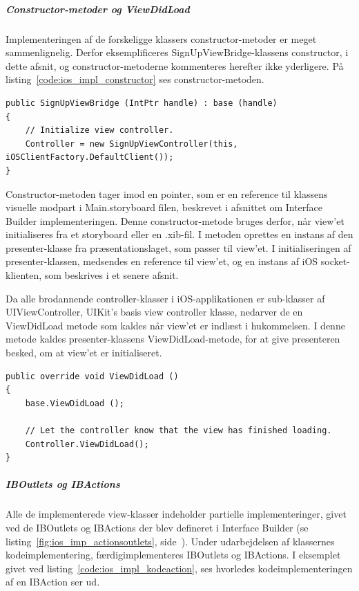 \subparagraph{Constructor-metoder og ViewDidLoad}
Implementeringen af de forskeligge klassers constructor-metoder er meget sammenlignelig. Derfor eksemplificeres SignUpViewBridge-klassens constructor, i dette afsnit, og constructor-metoderne kommenteres herefter ikke yderligere. På listing~\ref{code:ios_impl_constructor} ses constructor-metoden.

\begin{lstlisting}[caption={SignUpViewBridge(...)},label={code:ios_impl_constructor}]
public SignUpViewBridge (IntPtr handle) : base (handle)
{
	// Initialize view controller.
	Controller = new SignUpViewController(this, iOSClientFactory.DefaultClient());
}
\end{lstlisting}

Constructor-metoden tager imod en pointer, som er en reference til klassens visuelle modpart i Main.storyboard filen, beskrevet i afsnittet om Interface Builder implementeringen. Denne constructor-metode bruges derfor, når view'et initialiseres fra et storyboard eller en .xib-fil. I metoden oprettes en instans af den presenter-klasse fra præsentationslaget, som passer til view'et. I initialiseringen af presenter-klassen, medsendes en reference til view'et, og en instans af iOS socket-klienten, som beskrives i et senere afsnit.

Da alle brodannende controller-klasser i iOS-applikationen er sub-klasser af UIViewController, UIKit's basis view controller klasse, nedarver de en ViewDidLoad metode som kaldes når view'et er indlæst i hukommelsen. I denne metode kaldes presenter-klassens ViewDidLoad-metode, for at give presenteren besked, om at view'et er initialiseret.

\begin{lstlisting}[caption={ViewDidLoad() i SignUpViewBridge},label={code:ios_impl_viewdidload}]
public override void ViewDidLoad ()
{
	base.ViewDidLoad ();
	
	// Let the controller know that the view has finished loading.
	Controller.ViewDidLoad();
}
\end{lstlisting}

\subparagraph{IBOutlets og IBActions}
Alle de implementerede view-klasser indeholder partielle implementeringer, givet ved de IBOutlets og IBActions der blev defineret i Interface Builder (se listing~\ref{fig:ios_imp_actionsoutlets}, side~\pageref{fig:ios_imp_actionsoutlets}). Under udarbejdelsen af klassernes kodeimplementering, færdigimplementeres IBOutlets og IBActions. I eksemplet givet ved listing~\ref{code:ios_impl_kodeaction}, ses hvorledes kodeimplementeringen af en IBAction ser ud.

